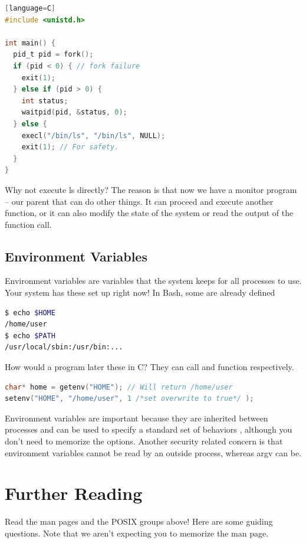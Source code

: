 \begin{lstlisting}[language=C][language=C]
#include <unistd.h>

int main() {
  pid_t pid = fork();
  if (pid < 0) { // fork failure
    exit(1);
  } else if (pid > 0) {
    int status;
    waitpid(pid, &status, 0);
  } else {
    execl("/bin/ls", "/bin/ls", NULL);
    exit(1); // For safety.
  }
}
\end{lstlisting}

Why not execute ls directly?
The reason is that now we have a monitor program -- our parent that can do other things.
It can proceed and execute another function, or it can also modify the state of the system or read the output of the function call.

\subsection{Environment Variables}

Environment variables are variables that the system keeps for all processes to use.
Your system has these set up right now!
In Bash, some are already defined

\begin{lstlisting}[language=bash]
$ echo $HOME
/home/user
$ echo $PATH
/usr/local/sbin:/usr/bin:...
\end{lstlisting}

How would a program later these in C?
They can call  and  function respectively.

\begin{lstlisting}[language=C]
char* home = getenv("HOME"); // Will return /home/user
setenv("HOME", "/home/user", 1 /*set overwrite to true*/ );
\end{lstlisting}

Environment variables are important because they are inherited between processes and can be used to specify a standard set of behaviors \cite{env_std_2018}, although you don't need to memorize the options.
Another security related concern is that environment variables cannot be read by an outside process, whereas argv can be.

\section{Further Reading}

Read the man pages and the POSIX groups above!
Here are some guiding questions.
Note that we aren't expecting you to memorize the man page.

